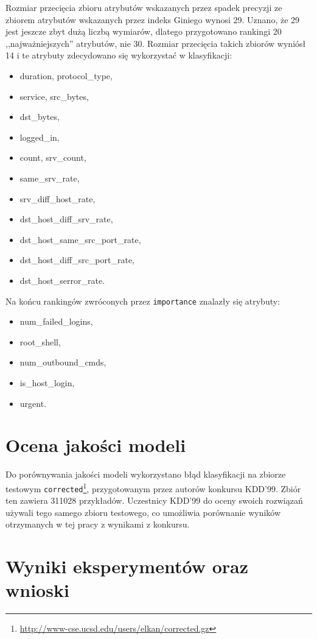 \documentclass[a4paper, 12pt]{article}
\begin{document}
Rozmiar przecięcia zbioru atrybutów wskazanych przez spadek precyzji ze zbiorem
atrybutów wskazanych przez indeks Giniego wynosi 29. Uznano, że 29 jest jeszcze zbyt dużą liczbą
wymiarów, dlatego przygotowano rankingi 20 ,,najważniejszych'' atrybutów, nie 30.
Rozmiar przecięcia takich zbiorów wyniósł 14 i te atrybuty zdecydowano się wykorzystać 
w klasyfikacji: 
\begin{itemize}
	\item duration, protocol\_type,
	\item service, src\_bytes,
	\item dst\_bytes,
	\item logged\_in,
	\item count, srv\_count,
	\item same\_srv\_rate, 
	\item srv\_diff\_host\_rate, 
	\item dst\_host\_diff\_srv\_rate, 
	\item dst\_host\_same\_src\_port\_rate,
	\item dst\_host\_diff\_src\_port\_rate, 
	\item dst\_host\_serror\_rate.
\end{itemize}
Na końcu rankingów zwróconych przez \texttt{importance} znalazły się atrybuty:
\begin{itemize}
	\item num\_failed\_logins,
	\item root\_shell,
	\item num\_outbound\_cmds,
	\item is\_host\_login,
	\item urgent.
\end{itemize}   

\section{Ocena jakości modeli}

Do porównywania jakości modeli wykorzystano błąd klasyfikacji na zbiorze testowym 
\texttt{corrected}\footnote{\url{http://www-cse.ucsd.edu/users/elkan/corrected.gz}},
przygotowanym przez autorów konkursu KDD'99.
Zbiór ten zawiera 311028 przykładów. 
Uczestnicy KDD'99 do oceny swoich rozwiązań używali tego samego zbioru testowego,
co umożliwia porównanie wyników otrzymanych w tej pracy z wynikami z konkursu.

\section{Wyniki eksperymentów oraz wnioski}
\label{sec:wyniki}
\end{document}
